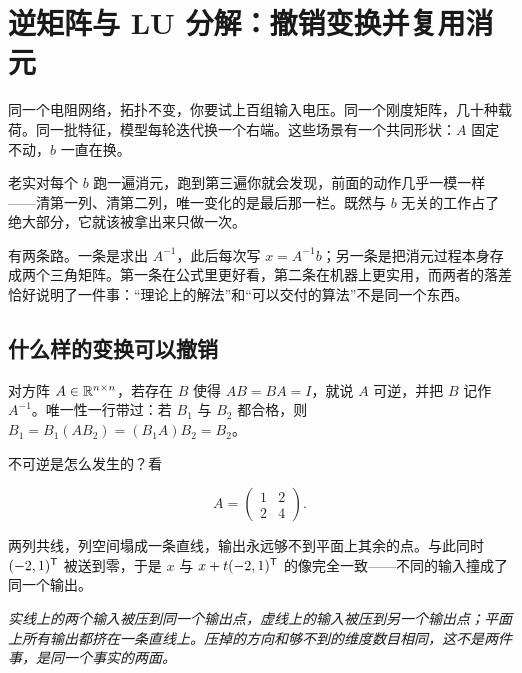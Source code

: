 \section{逆矩阵与 LU 分解：撤销变换并复用消元}
\label{sec:03-Linear-Algebra/01-Linear-Systems-and-Matrices/03}

同一个电阻网络，拓扑不变，你要试上百组输入电压。同一个刚度矩阵，几十种载荷。同一批特征，模型每轮迭代换一个右端。这些场景有一个共同形状：\(A\) 固定不动，\(b\) 一直在换。

老实对每个 \(b\) 跑一遍消元，跑到第三遍你就会发现，前面的动作几乎一模一样——清第一列、清第二列，唯一变化的是最后那一栏。既然与 \(b\) 无关的工作占了绝大部分，它就该被拿出来只做一次。

有两条路。一条是求出 \(A^{-1}\)，此后每次写 \(x=A^{-1}b\)；另一条是把消元过程本身存成两个三角矩阵。第一条在公式里更好看，第二条在机器上更实用，而两者的落差恰好说明了一件事：``理论上的解法''和``可以交付的算法''不是同一个东西。

\subsection{什么样的变换可以撤销}

对方阵 \(A\in\mathbb{R}^{n\times n}\)，若存在 \(B\) 使得 \(AB=BA=I\)，就说 \(A\) 可逆，并把 \(B\) 记作 \(A^{-1}\)。唯一性一行带过：若 \(B_1\) 与 \(B_2\) 都合格，则 \(B_1=B_1(AB_2)=(B_1A)B_2=B_2\)。

不可逆是怎么发生的？看

\[
A=\begin{pmatrix}1&2\\2&4\end{pmatrix}.
\]

两列共线，列空间塌成一条直线，输出永远够不到平面上其余的点。与此同时 \((-2,1)^{\mathsf{T}}\) 被送到零，于是 \(x\) 与 \(x+t(-2,1)^{\mathsf{T}}\) 的像完全一致——不同的输入撞成了同一个输出。

\begin{center}

\emph{实线上的两个输入被压到同一个输出点，虚线上的输入被压到另一个输出点；平面上所有输出都挤在一条直线上。压掉的方向和够不到的维度数目相同，这不是两件事，是同一个事实的两面。}
\end{center}

